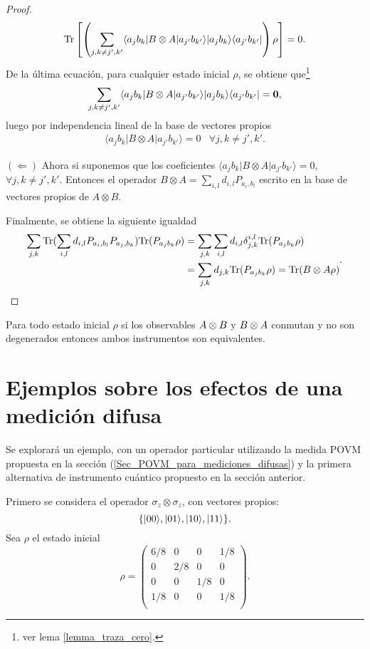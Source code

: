 \begin{proof}
\[\begin{split}
    {\rm Tr}\left[\left(\sum_{j,k\ne j',k'}  \langle a_j b_k |B\otimes A|a_{j'}b_{k'}\rangle |a_j b_k\rangle \langle a_{j'}b_{k'}|\right)\rho\right]&=0.\\
    \end{split}\]
    De la última ecuación, para cualquier estado inicial $\rho$, se obtiene que\footnote[1]{ver lema {\ref{lemma_traza_cero}}.} 
    \[\sum_{j,k\ne j', k'} \langle a_j b_k |B\otimes A|a_{j'}b_{k'}\rangle |a_j b_k\rangle \langle a_{j'}b_{k'}|=\mathbf{0},\] luego por independencia lineal de la base de vectores propios  
     \[\begin{array}{cc}
        \langle a_j b_k |B\otimes A|a_{j'}b_{k'}\rangle=0& \forall j,k\ne j',k'.\end{array}\]

        $(\Leftarrow)$
        Ahora si suponemos que los coeficientes  $\langle a_j b_k |B\otimes A|a_{j'}b_{k'}\rangle=0$,  $\forall j,k\ne j',k'$. Entonces el operador $B\otimes A=\sum_{i,l}d_{i,l}P_{a_i, b_l}$ escrito en la base de vectores propios de $A\otimes B$.
        
        Finalmente, se obtiene la siguiente igualdad \[\begin{split}\sum_{j,k}{\rm Tr}( \sum_{i,l}d_{i,l}P_{a_i, b_l} P_{a_j,b_k}){\rm Tr}(P_{a_j b_k}\rho )&=\sum_{j,k}\sum_{i,l}d_{i,l}\delta_{j,k}^{i,l}{\rm Tr}(P_{a_j b_k}\rho )\\&=\sum_{j,k}d_{j,k}{\rm Tr}(P_{a_j b_k}\rho )={\rm Tr}(B\otimes A\rho)\end{split}.\]


\end{proof}

\begin{corollary}
   Para todo estado inicial $\rho$ si los observables $A\otimes B$ y $B\otimes A$ conmutan y  no son degenerados entonces ambos instrumentos son equivalentes.
\end{corollary}


\section{Ejemplos sobre los efectos de una medición difusa} %

Se explorará un ejemplo, con un operador particular utilizando la medida POVM propuesta en la sección ({\ref{Sec_POVM_para_mediciones_difusas}}) y la primera alternativa de instrumento cuántico propuesto en la sección anterior.


Primero se considera el operador $\sigma_z \otimes \sigma_z$, con vectores propios: \[\{|00\rangle, |01\rangle, |10\rangle, |11\rangle\}.\] Sea $\rho $ el estado inicial\[\rho={\begin{pmatrix}6/8&0&0 &1/8\\0&2/8&0 &0\\0 &0 &1/8 &0 \\1/8&0&0&1/8\\\end{pmatrix}}.\]

